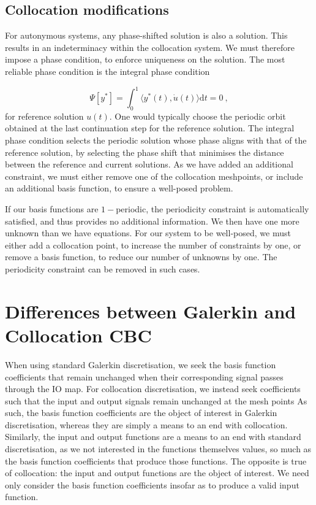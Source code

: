 \documentclass[11pt]{article}
\begin{document}
\subsection{Collocation modifications}
\label{sec:org6031e7a}

For autonymous systems, any phase-shifted solution is also a solution.
This results in an indeterminacy within the collocation system.
We must therefore impose a phase condition, to enforce uniqueness on the solution.
The most reliable phase condition \cite{kuznetsov2013elements} is the integral phase condition

\[\Psi[y^*] = \int_0^1\langle y^*(t),\dot{u}(t)\rangle\mathrm{d}t=0~,\]
for reference solution \(u(t)\).
One would typically choose the periodic orbit obtained at the last continuation step for the reference solution.
The integral phase condition selects the periodic solution whose phase aligns with that of the reference solution, by selecting the phase shift that minimises the distance between the reference and current solutions.
As we have added an additional constraint, we must either remove one of the collocation meshpoints, or include an additional basis function, to ensure a well-posed problem.

If our basis functions are \(1-\)periodic, the periodicity constraint is automatically satisfied, and thus provides no additional information.
We then have one more unknown than we have equations.
For our system to be well-posed, we must either add a collocation point, to increase the number of constraints by one, or remove a basis function, to reduce our number of unknowns by one.
The periodicity constraint can be removed in such cases.

\section{Differences between Galerkin and Collocation CBC}
\label{sec:org76f6381}

When using standard Galerkin discretisation, we seek the basis function coefficients that remain unchanged when their corresponding signal passes through the IO map.
For collocation discretisation, we instead seek coefficients such that the input and output signals remain unchanged at the mesh points
As such, the basis function coefficients are the object of interest in Galerkin discretisation, whereas they are simply a means to an end with collocation.
Similarly, the input and output functions are a means to an end with standard discretisation, as we not interested in the functions themselves values, so much as the basis function coefficients that produce those functions.
The opposite is true of collocation: the input and output functions are the object of interest.
We need only consider the basis function coefficients insofar as to produce a valid input function.
\end{document}
